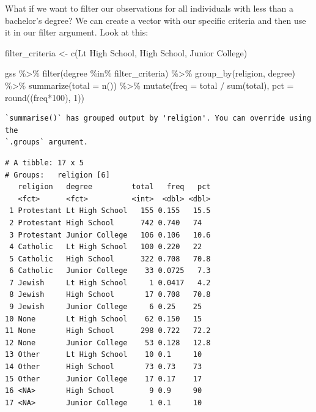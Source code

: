 \documentclass[
  letterpaper,
]{book}
\newenvironment{Shaded}{\begin{snugshade}}{\end{snugshade}}
\newcommand{\AttributeTok}[1]{\textcolor[rgb]{0.40,0.45,0.13}{#1}}
\newcommand{\DecValTok}[1]{\textcolor[rgb]{0.68,0.00,0.00}{#1}}
\newcommand{\FunctionTok}[1]{\textcolor[rgb]{0.28,0.35,0.67}{#1}}
\newcommand{\NormalTok}[1]{\textcolor[rgb]{0.00,0.23,0.31}{#1}}
\newcommand{\OtherTok}[1]{\textcolor[rgb]{0.00,0.23,0.31}{#1}}
\newcommand{\SpecialCharTok}[1]{\textcolor[rgb]{0.37,0.37,0.37}{#1}}
\newcommand{\StringTok}[1]{\textcolor[rgb]{0.13,0.47,0.30}{#1}}
\begin{document}
What if we want to filter our observations for all individuals with less
than a bachelor's degree? We can create a vector with our specific
criteria and then use it in our filter argument. Look at this:

\begin{Shaded}
\begin{Highlighting}[]
\NormalTok{filter\_criteria }\OtherTok{\textless{}{-}} \FunctionTok{c}\NormalTok{(}\StringTok{\textquotesingle{}Lt High School\textquotesingle{}}\NormalTok{, }\StringTok{\textquotesingle{}High School\textquotesingle{}}\NormalTok{, }\StringTok{\textquotesingle{}Junior College\textquotesingle{}}\NormalTok{)}

\NormalTok{gss }\SpecialCharTok{\%\textgreater{}\%}
  \FunctionTok{filter}\NormalTok{(degree }\SpecialCharTok{\%in\%}\NormalTok{ filter\_criteria) }\SpecialCharTok{\%\textgreater{}\%}
  \FunctionTok{group\_by}\NormalTok{(religion, degree) }\SpecialCharTok{\%\textgreater{}\%}
  \FunctionTok{summarize}\NormalTok{(}\AttributeTok{total =} \FunctionTok{n}\NormalTok{()) }\SpecialCharTok{\%\textgreater{}\%}
  \FunctionTok{mutate}\NormalTok{(}\AttributeTok{freq =}\NormalTok{ total }\SpecialCharTok{/} \FunctionTok{sum}\NormalTok{(total),}
         \AttributeTok{pct =} \FunctionTok{round}\NormalTok{((freq}\SpecialCharTok{*}\DecValTok{100}\NormalTok{), }\DecValTok{1}\NormalTok{))}
\end{Highlighting}
\end{Shaded}

\begin{verbatim}
`summarise()` has grouped output by 'religion'. You can override using the
`.groups` argument.
\end{verbatim}

\begin{verbatim}
# A tibble: 17 x 5
# Groups:   religion [6]
   religion   degree         total   freq   pct
   <fct>      <fct>          <int>  <dbl> <dbl>
 1 Protestant Lt High School   155 0.155   15.5
 2 Protestant High School      742 0.740   74  
 3 Protestant Junior College   106 0.106   10.6
 4 Catholic   Lt High School   100 0.220   22  
 5 Catholic   High School      322 0.708   70.8
 6 Catholic   Junior College    33 0.0725   7.3
 7 Jewish     Lt High School     1 0.0417   4.2
 8 Jewish     High School       17 0.708   70.8
 9 Jewish     Junior College     6 0.25    25  
10 None       Lt High School    62 0.150   15  
11 None       High School      298 0.722   72.2
12 None       Junior College    53 0.128   12.8
13 Other      Lt High School    10 0.1     10  
14 Other      High School       73 0.73    73  
15 Other      Junior College    17 0.17    17  
16 <NA>       High School        9 0.9     90  
17 <NA>       Junior College     1 0.1     10  
\end{verbatim}
\end{document}
